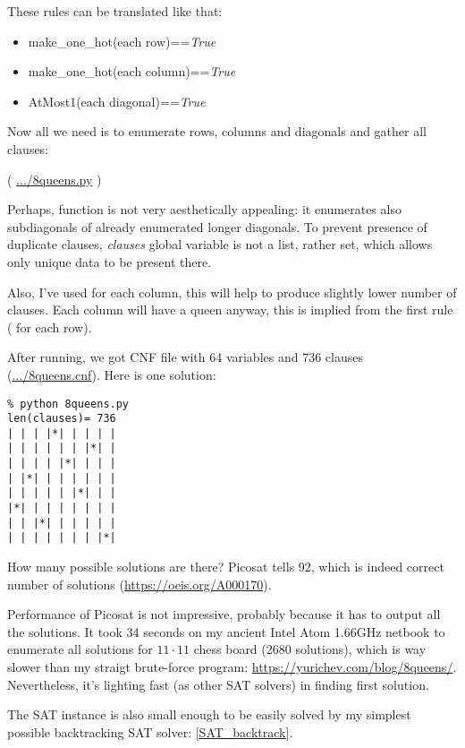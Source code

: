 These rules can be translated like that:

\begin{itemize}
\item make\_one\_hot(each row)==\textit{True}

\item make\_one\_hot(each column)==\textit{True}

\item AtMost1(each diagonal)==\textit{True}
\end{itemize}

Now all we need is to enumerate rows, columns and diagonals and gather all clauses:


( \url{.../8queens.py} )

Perhaps,  function is not very aesthetically appealing: it enumerates also subdiagonals
of already enumerated longer diagonals.
To prevent presence of duplicate clauses, \textit{clauses} global variable is not a list, rather set, which allows
only unique data to be present there.

Also, I've used  for each column, this will help to produce slightly lower number of clauses.
Each column will have a queen anyway, this is implied from the first rule ( for each row).

After running, we got CNF file with 64 variables and 736 clauses (\url{.../8queens.cnf}).
Here is one solution:

\begin{lstlisting}
% python 8queens.py
len(clauses)= 736
| | | |*| | | | |
| | | | | | |*| |
| | | | |*| | | |
| |*| | | | | | |
| | | | | |*| | |
|*| | | | | | | |
| | |*| | | | | |
| | | | | | | |*|
\end{lstlisting}

How many possible solutions are there?
Picosat tells 92, which is indeed correct number of solutions (\url{https://oeis.org/A000170}).

Performance of Picosat is not impressive, probably because it has to output all the solutions.
It took 34 seconds on my ancient Intel Atom 1.66GHz netbook to enumerate all solutions for $11 \cdot 11$ chess board
(2680 solutions),
which is way slower than my straigt brute-force program: \url{https://yurichev.com/blog/8queens/}.
Nevertheless, it's lighting fast (as other SAT solvers) in finding first solution.

The SAT instance is also small enough to be easily solved by my simplest possible backtracking SAT solver:
\ref{SAT_backtrack}.

